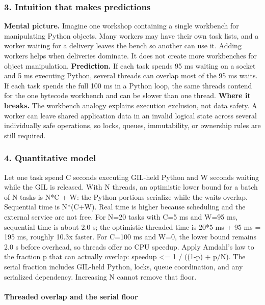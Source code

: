 \subsubsection*{3. Intuition that makes predictions}
\textbf{Mental picture.} Imagine one workshop containing a single workbench for manipulating Python objects. Many workers may have their own task lists, and a worker waiting for a delivery leaves the bench so another can use it. Adding workers helps when deliveries dominate. It does not create more workbenches for object manipulation.
\textbf{Prediction.} If each task spends 95 ms waiting on a socket and 5 ms executing Python, several threads can overlap most of the 95 ms waits. If each task spends the full 100 ms in a Python loop, the same threads contend for the one bytecode workbench and can be slower than one thread.
\textbf{Where it breaks.} The workbench analogy explains execution exclusion, not data safety. A worker can leave shared application data in an invalid logical state across several individually safe operations, so locks, queues, immutability, or ownership rules are still required.
\subsubsection*{4. Quantitative model}
Let one task spend C seconds executing GIL-held Python and W seconds waiting while the GIL is released. With N threads, an optimistic lower bound for a batch of N tasks is N*C + W: the Python portions serialize while the waits overlap. Sequential time is N*(C+W). Real time is higher because scheduling and the external service are not free.
For N=20 tasks with C=5 ms and W=95 ms, sequential time is about 2.0 s; the optimistic threaded time is 20*5 ms + 95 ms = 195 ms, roughly 10.3x faster. For C=100 ms and W=0, the lower bound remains 2.0 s before overhead, so threads offer no CPU speedup.
Apply Amdahl's law to the fraction p that can actually overlap: speedup <= 1 / ((1-p) + p/N). The serial fraction includes GIL-held Python, locks, queue coordination, and any serialized dependency. Increasing N cannot remove that floor.
\paragraph{Threaded overlap and the serial floor}
